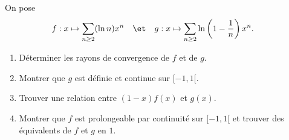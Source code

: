 \begin{enonce}
\begin{exercise}[ID={RMS124 E943 Centrale PSI},subtitle={},tags={}, difficulty={0}]
On pose
\begin{align*}
f&: x\mapsto \sum_{n\geq 2} (\ln n)x^n&
&\et&
g&:x\mapsto \sum_{n\geq 2}\ln\left( 1-\frac1n \right)x^n.
\end{align*}
\begin{enumerate}
  \item Déterminer les rayons de convergence de $f$ et de $g$.
  \item Montrer que $g$ est définie et continue sur $[-1,1[$.
  \item Trouver une relation entre $(1-x)f(x)$ et $g(x)$.
  \item Montrer que $f$ est prolongeable par continuité sur $[-1,1[$
    et trouver des équivalents de $f$ et $g$ en $1$.
\end{enumerate}
\end{exercise}
\begin{solution}
\end{solution}
\end{enonce}
